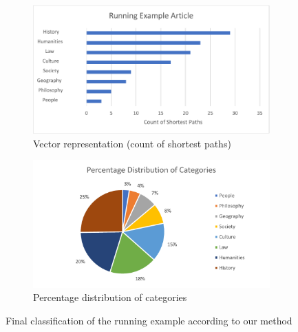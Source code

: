 \begin{figure}[htbp]
\centering
\begin{subfigure}{0.49\textwidth}
\centering
\includegraphics[width = \textwidth]{imgs/running_example_2}
\caption{Vector representation (count of shortest paths)}
\label{fig:final-classification-2}
\end{subfigure}
\begin{subfigure}{0.49\textwidth}
\centering
\includegraphics[width = \textwidth]{imgs/running_example_1}
\caption{Percentage distribution of categories}
\label{fig:final-classification-1}
\end{subfigure}
\caption{Final classification of the  running example according to our method}
\label{fig:final-classification-example}
\end{figure}




